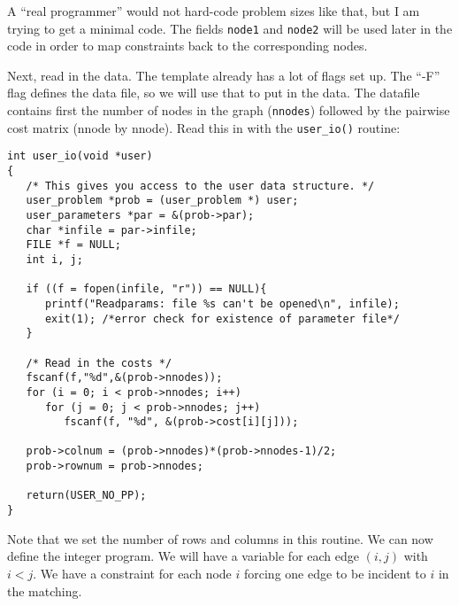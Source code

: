 \documentclass[11pt]{article}
\begin{document}
A ``real programmer'' would not hard-code problem sizes like that, but I am
trying to get a minimal code. The fields \texttt{node1} and \texttt{node2} will
be used later in the code in order to map constraints back to the
corresponding nodes.

Next, read in the data. The template already has a lot of flags set up. The
``-F'' flag defines the data file, so we will use that to put in the data. The
datafile contains first the number of nodes in the graph (\texttt{nnodes})
followed by the pairwise cost matrix (nnode by nnode). Read this in with the
\texttt{user\_io()} routine:

\begin{verbatim}
int user_io(void *user)
{
   /* This gives you access to the user data structure. */
   user_problem *prob = (user_problem *) user;
   user_parameters *par = &(prob->par);
   char *infile = par->infile;
   FILE *f = NULL;
   int i, j;

   if ((f = fopen(infile, "r")) == NULL){
      printf("Readparams: file %s can't be opened\n", infile);
      exit(1); /*error check for existence of parameter file*/
   }

   /* Read in the costs */
   fscanf(f,"%d",&(prob->nnodes));
   for (i = 0; i < prob->nnodes; i++)
      for (j = 0; j < prob->nnodes; j++)
         fscanf(f, "%d", &(prob->cost[i][j]));
   
   prob->colnum = (prob->nnodes)*(prob->nnodes-1)/2;
   prob->rownum = prob->nnodes;

   return(USER_NO_PP);
}
\end{verbatim}   

Note that we set the number of rows and columns in this routine. We can now
define the integer program. We will have a variable for each edge $(i,j)$ with
$i<j$. We have a constraint for each node $i$ forcing one edge to be incident
to $i$ in the matching.
\end{document}
